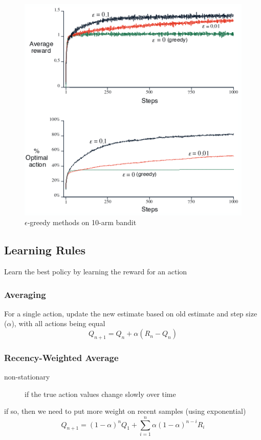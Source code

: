 \documentclass[]{article}
\theoremstyle{definition}
\begin{document}
\begin{figure}[ht]
    \centering
    \includegraphics[width=0.5\linewidth]{epsilon_10arm.png}
    \caption{$\epsilon$-greedy methods on 10-arm bandit}
    \label{fig:}
\end{figure}


\subsection{Learning Rules}
\label{sub:learning_rules}

Learn the best policy by learning the reward for an action

\subsubsection{Averaging}
\label{ssub:averaging}

For a single action, update the new estimate based on old estimate and step size ($\alpha$), with all actions being equal
\begin{equation*}
    Q_{n+1} = Q_n + \alpha (R_n - Q_n)
\end{equation*}

\subsubsection{Recency-Weighted Average}
\label{ssub:recency_weighted_average}

\begin{description}
    \item[non-stationary] if the true action values change slowly over time
\end{description}

if so, then we need to put more weight on recent samples (using exponential)
\begin{equation*}
    Q_{n+1} = (1 - \alpha)^n Q_1 + \sum_{i=1}^n \alpha(1 - \alpha)^{n - i} R_i
\end{equation*}
\end{document}
